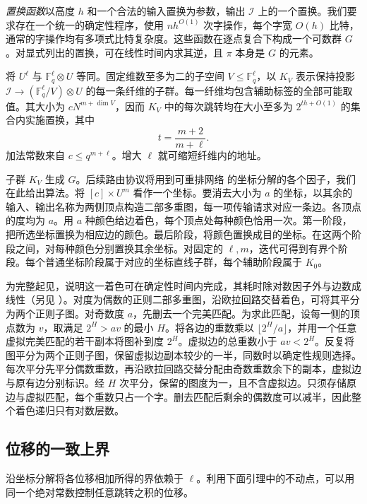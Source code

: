 \emph{置换函数}以高度 $h$ 和一个合法的输入置换为参数，输出 $\mathcal I$ 上的一个置换。我们要求存在一个统一的确定性程序，使用 $nh^{O(1)}$ 次字操作，每个字宽 $O(h)$ 比特，通常的字操作均有多项式比特复杂度。这些函数在逐点复合下构成一个可数群 $G$。对显式列出的置换，可在线性时间内求其逆，且 $\pi$ 本身是 $G$ 的元素。

将 $U^\ell$ 与 $\mathbb F_q^\ell\otimes U$ 等同。固定维数至多为二的子空间 $V\le\mathbb F_q^\ell$，以 $K_V$ 表示保持投影 $\mathcal I\to(\mathbb F_q^\ell/V)\otimes U$ 的每一条纤维的子群。每一纤维均包含辅助标签的全部可能取值。其大小为 $cN^{m+\dim V}$，因而 $K_V$ 中的每次跳转均在大小至多为 $2^{th+O(1)}$ 的集合内实施置换，其中 \begin{equation}\label{eq:sort-hop-height}
                         t=\frac{m+2}{m+\ell}.
\end{equation} 加法常数来自 $c\le q^{m+\ell}$。增大 $\ell$ 就可缩短纤维内的地址。

子群 $K_V$ 生成 $G$。后续路由协议将用到可重排网络 \cite{benes} 的坐标分解的各个因子，我们在此给出算法。将 $[c]\times U^m$ 看作一个坐标。要消去大小为 $a$ 的坐标，以其余的输入、输出名称为两侧顶点构造二部多重图，每一项传输请求对应一条边。各顶点的度均为 $a$。用 $a$ 种颜色给边着色，每个顶点处每种颜色恰用一次。第一阶段，把所选坐标置换为相应边的颜色。最后阶段，将颜色置换成目的坐标。在这两个阶段之间，对每种颜色分别置换其余坐标。对固定的 $\ell,m$，迭代可得到有界个阶段。每个普通坐标阶段属于对应的坐标直线子群，每个辅助阶段属于 $K_0$。

为完整起见，说明这一着色可在确定性时间内完成，其耗时除对数因子外与边数成线性（另见 \cite{color}）。对度为偶数的正则二部多重图，沿欧拉回路交替着色，可将其平分为两个正则子图。对奇数度 $a$，先删去一个完美匹配。为求此匹配，设每一侧的顶点数为 $v$，取满足 $2^H>av$ 的最小 $H$。将各边的重数乘以 $\lfloor 2^H/a\rfloor$，并用一个任意虚拟完美匹配的若干副本将图补到度 $2^H$。虚拟边的总重数小于 $av<2^H$。反复将图平分为两个正则子图，保留虚拟边副本较少的一半，同数时以确定性规则选择。每次平分先平分偶数重数，再沿欧拉回路交替分配由奇数重数余下的副本，虚拟边与原有边分别标识。经 $H$ 次平分，保留的图度为一，且不含虚拟边。只须存储原边与虚拟匹配，每个重数只占一个字。删去匹配后剩余的偶数度可以减半，因此整个着色递归只有对数层数。

\subsection{位移的一致上界}

沿坐标分解将各位移相加所得的界依赖于 $\ell$。利用下面引理中的不动点，可以用同一个绝对常数控制任意跳转之积的位移。

